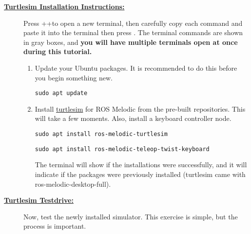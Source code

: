 \documentclass[12pt]{article}
\begin{document}
\begin{description}
\begin{itemize}
\end{itemize}

\item[\textbf{\underline{Turtlesim Installation Instructions:}}] \hfill \vspace{0mm}

Press \CTRLKey+\ALTKey+\TKey to open a new terminal, then carefully copy each command and paste it into the terminal then press \ENTERKey. The terminal commands are shown in gray boxes, and {\bf you will have multiple terminals open at once during this tutorial.} 


\begin{enumerate}    
 
	\item Update your Ubuntu packages. It is recommended to do this before you begin something new. 

	\begin{verbatim}
sudo apt update
	\end{verbatim} 
 
\item Install \href{http://wiki.ros.org/turtlesim}{turtlesim} for ROS Melodic from the pre-built repositories. This will take a few moments. Also, install a keyboard controller node.
			
\begin{verbatim}
sudo apt install ros-melodic-turtlesim
\end{verbatim}

\begin{verbatim}
sudo apt install ros-melodic-teleop-twist-keyboard
\end{verbatim}
	
The terminal will show if the installations were successfully, and it will indicate if the packages were previously installed (turtlesim came with ros-melodic-desktop-full).
	
\end{enumerate}	

\newpage
\item[\textbf{\underline{Turtlesim Testdrive:}}] \hfill \vspace{0mm}

Now, test the newly installed simulator. This exercise is simple, but the process is important. 

%
\begin{enumerate}


\end{enumerate}
\end{description}
\end{document}
